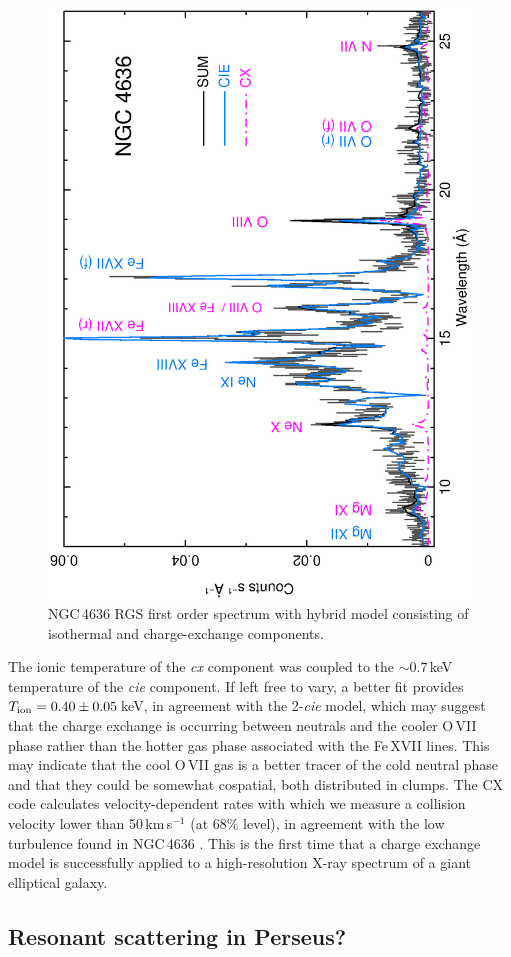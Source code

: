 \documentclass[useAMS,usenatbib]{mn2e}
\begin{document}
{\begin{figure}
  \includegraphics[width=0.7\columnwidth, angle=-90,bb=50 100 510 752]{paper_ovii_fig03.ps}
   \caption{NGC\,4636 RGS first order spectrum with hybrid model
   consisting of isothermal and charge-exchange components.} \label{Fig:NGC4636}
\end{figure} 

The ionic temperature of the \textit{cx} component was coupled to the $\sim0.7$\,keV 
temperature of the \textit{cie} component.
If left free to vary, a better fit provides $T_{\rm ion}=0.40\pm0.05$\,keV,
in agreement with the 2-\textit{cie} model, which may suggest that the charge exchange is 
occurring between neutrals and the cooler O\,{\small VII} phase rather than 
the hotter gas phase associated with the Fe\,{\small XVII} lines. 
This may indicate that the cool O\,{\small VII} gas is a better
tracer of the cold neutral phase and that they could be somewhat cospatial,
both distributed in clumps. 
The CX code calculates velocity-dependent rates with which
we measure a collision velocity lower than 50\,km\,s$^{-1}$ (at 68\% level),
in agreement with the low turbulence found in NGC\,4636 \citep{Werner2009}.
This is the first time that a charge exchange model is successfully applied
to a high-resolution X-ray spectrum of a giant elliptical galaxy.

\subsection{Resonant scattering in Perseus?}

}
\end{document}
